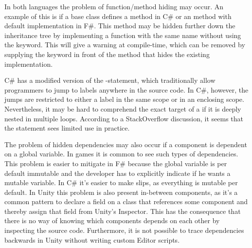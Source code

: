 In both languages the problem of function/method hiding may occur. An example of this is if a base class defines a  method in C\# or an  method with default implementation in F\#. This method may be hidden further down the inheritance tree by implementing a function with the same name without using the  keyword. This will give a warning at compile-time, which can be removed by supplying the  keyword in front of the method that hides the existing implementation.

C\# has a modified version of the -statement, which traditionally allow programmers to jump to labels anywhere in the source code. In C\#, however, the jumps are restricted to either a label in the same scope or in an enclosing scope\cite{csharp:goto}. Nevertheless, it may be hard to comprehend the exact target of a  if it is deeply nested in multiple loops. According to a StackOverflow discussion\cite{goto:stack:overflow}, it seems that the  statement sees limited use in practice.

The problem of hidden dependencies may also occur if a component is dependent on a global variable. In games it is common to see such types of dependencies\cite{blow2004game, guana2015building, nystrom2014game}. This problem is easier to mitigate in F\# because the global variable is per default immutable and the developer has to explicitly indicate if he wants a mutable variable. In C\# it's easier to make slips, as everything is mutable per default. In Unity this problem is also present in-between components, as it's a common pattern to declare a field on a class that references some component and thereby assign that field from Unity's Inspector\cite{unity:inspector:assignment}. This has the consequence that there is no way of knowing which components depends on each other by inspecting the source code. Furthermore, it is not possible to trace dependencies backwards in Unity without writing custom Editor scripts\cite{unity:dependencies:backwards}.

